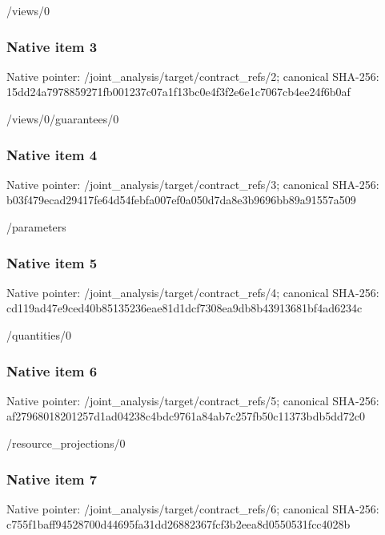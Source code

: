 \documentclass[10pt,a4paper]{article}
\begin{document}
\begingroup\raggedright\sloppy /\allowbreak{}views/\allowbreak{}0\par\endgroup

\subsubsection{Native item 3}
Native pointer: /joint\_\allowbreak{}analysis/target/contract\_\allowbreak{}refs/2; canonical SHA-256: 15dd24a7978859271fb001237c07a1f13bc0e4f3f2e6e1c7067cb4ee24f6b0af

\begingroup\raggedright\sloppy /\allowbreak{}views/\allowbreak{}0/\allowbreak{}guarantees/\allowbreak{}0\par\endgroup

\subsubsection{Native item 4}
Native pointer: /joint\_\allowbreak{}analysis/target/contract\_\allowbreak{}refs/3; canonical SHA-256: b03f479ecad29417fe64d54febfa007ef0a050d7da8e3b9696bb89a91557a509

\begingroup\raggedright\sloppy /\allowbreak{}parameters\par\endgroup

\subsubsection{Native item 5}
Native pointer: /joint\_\allowbreak{}analysis/target/contract\_\allowbreak{}refs/4; canonical SHA-256: cd119ad47e9ced40b85135236eae81d1dcf7308ea9db8b43913681bf4ad6234c

\begingroup\raggedright\sloppy /\allowbreak{}quantities/\allowbreak{}0\par\endgroup

\subsubsection{Native item 6}
Native pointer: /joint\_\allowbreak{}analysis/target/contract\_\allowbreak{}refs/5; canonical SHA-256: af27968018201257d1ad04238c4bdc9761a84ab7c257fb50c11373bdb5dd72c0

\begingroup\raggedright\sloppy /\allowbreak{}resource\_\allowbreak{}projections/\allowbreak{}0\par\endgroup

\subsubsection{Native item 7}
Native pointer: /joint\_\allowbreak{}analysis/target/contract\_\allowbreak{}refs/6; canonical SHA-256: c755f1baff94528700d44695fa31dd26882367fcf3b2eea8d0550531fcc4028b
\end{document}
